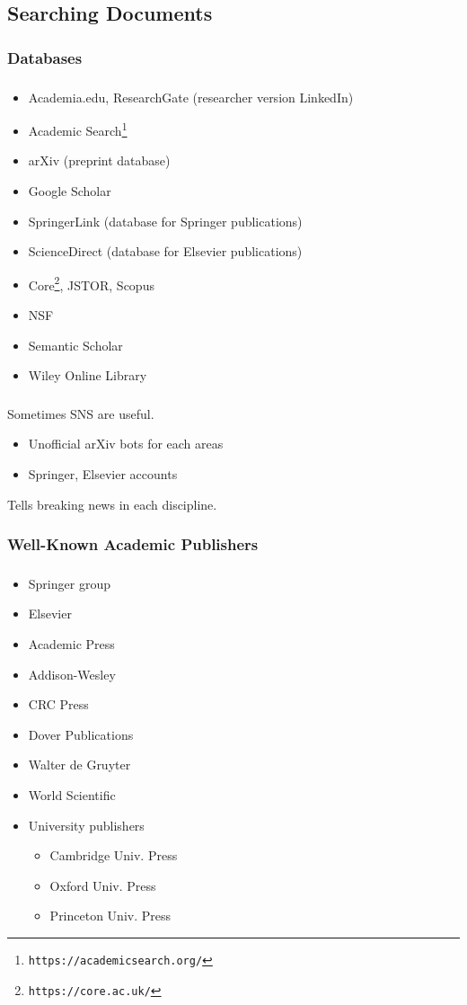 \documentclass[dvipdfmx,10pt]{beamer}
\newcommand{\ft}{\frametitle}
\newcommand{\bit}{\begin{itemize}}
\newcommand{\eit}{\end{itemize}}
\begin{document}
\subsection{Searching Documents}
\subsubsection{Databases}
\begin{frame}\ft{\insertsubsubsection}
\bit
\item Academia.edu, ResearchGate (researcher version LinkedIn)
\item Academic Search\footnote{\texttt{https://academicsearch.org/}}
\item arXiv (preprint database)
\item Google Scholar
\item SpringerLink (database for Springer publications)
\item ScienceDirect (database for Elsevier publications)
\item Core\footnote{\texttt{https://core.ac.uk/}}, JSTOR, Scopus
\item NSF
\item Semantic Scholar
\item Wiley Online Library
\eit
\end{frame}
\begin{frame}\ft{\insertsubsubsection}
Sometimes SNS are useful.
\bit
\item Unofficial arXiv bots for each areas
\item Springer, Elsevier accounts
\eit
Tells breaking news in each discipline.
\end{frame}
\subsubsection{Well-Known Academic Publishers}
\begin{frame}\ft{\insertsubsubsection}
\bit
\item Springer group
\item Elsevier
\item Academic Press
\item Addison-Wesley
\item CRC Press
\item Dover Publications
\item Walter de Gruyter
\item World Scientific
\item University publishers
\bit
\item Cambridge Univ. Press
\item Oxford Univ. Press
\item Princeton Univ. Press
\eit
\eit
\end{frame}
\end{document}
